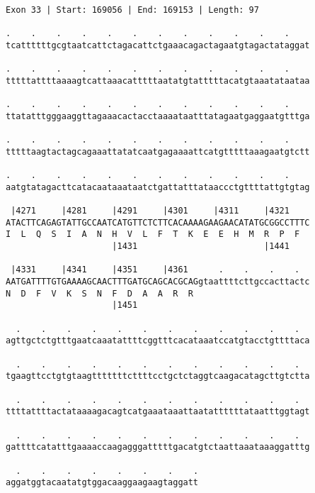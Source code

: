 \documentclass{article}
\begin{document}
\newpage
\begin{Verbatim}
Exon 33 | Start: 169056 | End: 169153 | Length: 97
 
.    .    .    .    .    .    .    .    .    .    .    .    
tcattttttgcgtaatcattctagacattctgaaacagactagaatgtagactataggat
  
.    .    .    .    .    .    .    .    .    .    .    .    
tttttattttaaaagtcattaaacatttttaatatgtatttttacatgtaaatataataa
  
.    .    .    .    .    .    .    .    .    .    .    .    
ttatatttgggaaggttagaaacactacctaaaataatttatagaatgaggaatgtttga
  
.    .    .    .    .    .    .    .    .    .    .    .    
tttttaagtactagcagaaattatatcaatgagaaaattcatgtttttaaagaatgtctt
  
.    .    .    .    .    .    .    .    .    .    .    .    
aatgtatagacttcatacaataaataatctgattatttataaccctgttttattgtgtag
  
 |4271     |4281     |4291     |4301     |4311     |4321    
ATACTTCAGAGTATTGCCAATCATGTTCTCTTCACAAAAGAAGAACATATGCGGCCTTTC
I  L  Q  S  I  A  N  H  V  L  F  T  K  E  E  H  M  R  P  F  
                     |1431                         |1441    
  
 |4331     |4341     |4351     |4361      .    .    .    .  
AATGATTTTGTGAAAAGCAACTTTGATGCAGCACGCAGgtaattttcttgccacttactc
N  D  F  V  K  S  N  F  D  A  A  R  R                       
                     |1451                                  
  
  .    .    .    .    .    .    .    .    .    .    .    .  
agttgctctgtttgaatcaaatattttcggtttcacataaatccatgtacctgttttaca
  
  .    .    .    .    .    .    .    .    .    .    .    .  
tgaagttcctgtgtaagtttttttcttttcctgctctaggtcaagacatagcttgtctta
  
  .    .    .    .    .    .    .    .    .    .    .    .  
ttttattttactataaaagacagtcatgaaataaattaatattttttataatttggtagt
  
  .    .    .    .    .    .    .    .    .    .    .    .  
gattttcatatttgaaaaccaagagggatttttgacatgtctaattaaataaaggatttg
  
  .    .    .    .    .    .    .    .
aggatggtacaatatgtggacaaggaagaagtaggatt
\end{Verbatim}
\newpage
\end{document}

